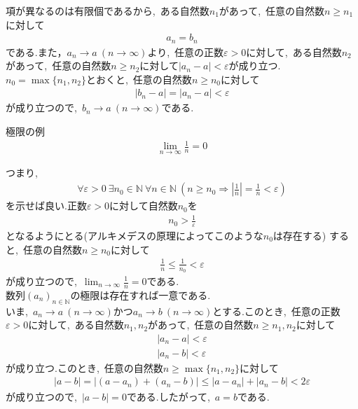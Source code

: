 \documentclass[hyperref,a4paper,12pt]{kininaruki}
\begin{document}
項が異なるのは有限個であるから,\, ある自然数$n_{1}$があって,\, 任意の自然数$n\geq n_{1}$に対して
\begin{align*}
    a_{n} = b_{n}
\end{align*}
である.また，$a_{n} \to a\ (n\to \infty)$より,\, 任意の正数$\varepsilon > 0$に対して,\, ある自然数$n_{2}$があって,\, 任意の自然数$n\geq n_{2}$に対して$|a_{n} - a| < \varepsilon$が成り立つ.\\
$n_{0} = \max\{n_{1},n_{2}\}$とおくと,\, 任意の自然数$n\geq n_{0}$に対して
\begin{align*}
    |b_{n} - a| = |a_{n} - a| < \varepsilon
\end{align*}
が成り立つので,\, $b_{n} \to a\ (n\to \infty)$である.\\


\begin{itembox}[l]{極限の例}
    \begin{align}
        \lim_{n\to \infty}\frac{1}{n} = 0
    \end{align}
\end{itembox}
つまり,
\begin{align*}
    \forall \varepsilon > 0\ \exists n_{0}\in \mathbb{N}\ \forall n \in \mathbb{N}\ \left( n\geq n_{0} \Rightarrow \left|\frac{1}{n} \right| = \frac{1}{n} < \varepsilon \right)
\end{align*}
を示せば良い.正数$\varepsilon > 0$に対して自然数$n_{0}$を
\begin{align*}
    n_{0} > \frac{1}{\varepsilon}
\end{align*}
となるようにとる(アルキメデスの原理によってこのような$n_{0}$は存在する)
すると,\, 任意の自然数$n\geq n_{0}$に対して
\begin{align*}
    \frac{1}{n} \leq \frac{1}{n_{0}} < \varepsilon
\end{align*}
が成り立つので,\, $\displaystyle \lim_{n\to \infty}\frac{1}{n} = 0$である.\\

数列$(a_{n})_{n\in \mathbb{N}}$の極限は存在すれば一意である.\\
いま,\, $a_{n} \to a\ (n\to \infty)$かつ$a_{n} \to b\ (n\to \infty)$とする.このとき,\, 任意の正数$\varepsilon > 0$に対して,\, ある自然数$n_{1},n_{2}$があって,\, 任意の自然数$n\geq n_{1},n_{2}$に対して
\begin{align*}
    |a_{n} - a| < \varepsilon\\
    |a_{n} - b| < \varepsilon
\end{align*}
が成り立つ.このとき,\, 任意の自然数$n\geq \max\{n_{1},n_{2}\}$に対して
\begin{align*}
    |a - b| = |(a - a_{n}) + (a_{n} - b)|\leq |a - a_{n}| + |a_{n} - b| < 2\varepsilon
\end{align*}
が成り立つので,\, $|a - b| = 0$である.したがって,\, $a = b$である.\\
\end{document}
